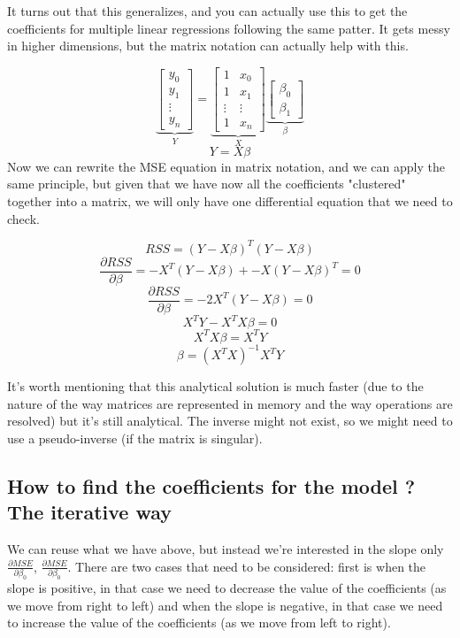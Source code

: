 \documentclass[12pt,a4paper]{article}
\begin{document}
It turns out that this generalizes, and you can actually use this to get the coefficients for multiple linear regressions following the same patter. It gets messy in higher dimensions, but the matrix notation can actually help with this.

\begin{equation*}
    \underbrace{
    \begin{bmatrix}
    y_{0} \\ y_{1} \\ \vdots \\ y_{n}
    \end{bmatrix}}_{Y} = 
    \underbrace{
    \begin{bmatrix}
        1 & x_{0} \\ 1 & x_{1} \\ \vdots & \vdots \\ 1 & x_{n}
    \end{bmatrix}
    }_{X}
    \underbrace{
    \begin{bmatrix}
        \beta_{0} \\ \beta_{1}
    \end{bmatrix}}_{\beta}
\end{equation*}
$$ Y = X\beta $$
Now we can rewrite the MSE equation in matrix notation, and we can apply the same principle, but given that we have now all the coefficients "clustered" together into a matrix, we will only have one differential equation that we need to check.

$$RSS = (Y - X\beta)^{T}(Y - X\beta)$$
$$\frac{\partial{RSS}}{\partial{\beta}} = -X^{T}(Y-X\beta) + -X(Y-X\beta)^{T} = 0$$
$$\frac{\partial{RSS}}{\partial{\beta}} = -2X^{T}(Y-X\beta)= 0$$
$$X^{T}Y - X^{T}X\beta = 0$$
$$X^{T}X\beta = X^{T}Y$$
$$\beta = (X^{T}X)^{-1}X^{T}Y$$

It's worth mentioning that this analytical solution is much faster (due to the nature of the way matrices are represented in memory and the way operations are resolved) but it's still analytical. The inverse might not exist, so we might need to use a pseudo-inverse (if the matrix is singular). 

\subsection{How to find the coefficients for the model ? The iterative way}

We can reuse what we have above, but instead we're interested in the slope only $\frac{\partial{MSE}}{\partial{\beta_{0}}}$, $\frac{\partial{MSE}}{\partial{\beta_{0}}}$. There are two cases that need to be considered: first is when the slope is positive, in that case we need to decrease the value of the coefficients (as we move from right to left) and when the slope is negative, in that case we need to increase the value of the coefficients (as we move from left to right).
\end{document}
